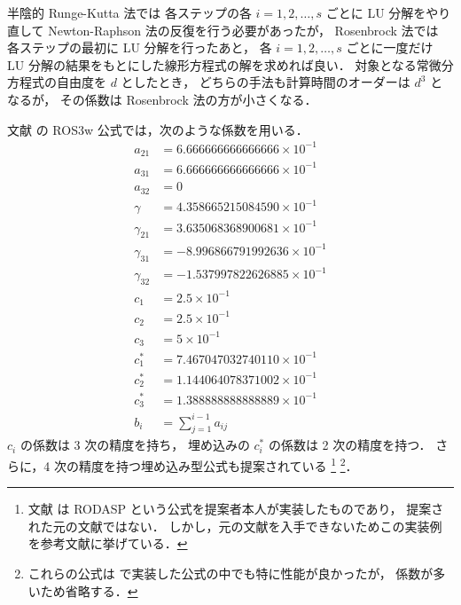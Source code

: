 半陰的 Runge-Kutta 法では
各ステップの各 $i = 1, 2, \ldots, s$ ごとに LU 分解をやり直して
Newton-Raphson 法の反復を行う必要があったが，
Rosenbrock 法では
各ステップの最初に LU 分解を行ったあと，
各 $i = 1, 2, \ldots, s$ ごとに一度だけ LU 分解の結果をもとにした線形方程式の解を求めれば良い．
対象となる常微分方程式の自由度を $d$ としたとき，
どちらの手法も計算時間のオーダーは $d^3$ となるが，
その係数は Rosenbrock 法の方が小さくなる．

文献 \cite{Rang2005} の ROS3w 公式では，次のような係数を用いる．
\begin{align}
    a_{21}      & = 6.666666666666666 \times 10^{-1}  \\
    a_{31}      & = 6.666666666666666 \times 10^{-1}  \\
    a_{32}      & = 0                                 \\
    \gamma      & = 4.358665215084590 \times 10^{-1}  \\
    \gamma_{21} & = 3.635068368900681 \times 10^{-1}  \\
    \gamma_{31} & = −8.996866791992636 \times 10^{-1} \\
    \gamma_{32} & = −1.537997822626885 \times 10^{-1} \\
    c_1         & = 2.5 \times 10^{-1}                \\
    c_2         & = 2.5 \times 10^{-1}                \\
    c_3         & = 5 \times 10^{-1}                  \\
    c_1^*       & = 7.467047032740110 \times 10^{-1}  \\
    c_2^*       & = 1.144064078371002 \times 10^{-1}  \\
    c_3^*       & = 1.388888888888889 \times 10^{-1}  \\
    b_i         & = \sum_{j = 1}^{i - 1} a_{ij}
\end{align}
$c_i$ の係数は 3 次の精度を持ち，
埋め込みの $c_i^*$ の係数は 2 次の精度を持つ．
さらに，4 次の精度を持つ埋め込み型公式も提案されている
\cite{Steinebach2022,Rang2015}
\footnote{文献 \cite{Steinebach2022} は RODASP という公式を提案者本人が実装したものであり，%
    提案された元の文献ではない．%
    しかし，元の文献を入手できないためこの実装例を参考文献に挙げている．}
\footnote{これらの公式は%
    \cite{NumericalCollectionCpp} で実装した公式の中でも特に性能が良かったが，%
    係数が多いため省略する．}．
